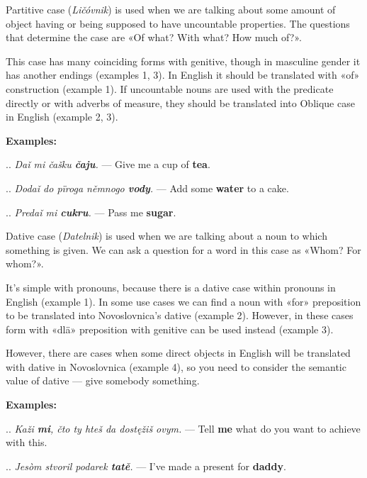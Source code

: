 Partitive case (\textit{Ličóvnik}) is used when we are talking about some amount of object having or being supposed to have uncountable properties. The questions that determine the case are «Of what? With what? How much of?».

This case has many coinciding forms with genitive, though in masculine gender it has another endings (examples 1, 3). In English it should be translated with «of» construction (example 1). If uncountable nouns are used with the predicate directly or with adverbs of measure, they should be translated into Oblique case in English (example 2, 3).

\textbf{Examples:}

.. \textit{Daǐ mi čašku \textbf{čaju}.} — Give me a cup of \textbf{tea}.

.. \textit{Dodaǐ do pïroga němnogo \textbf{vody}.} — Add some \textbf{water} to a cake.

.. \textit{Predaǐ mi \textbf{cukru}.} — Pass me \textbf{sugar}.

Dative case (\textit{Datelnik}) is used when we are talking about a noun to which something is given. We can ask a question for a word in this case as «Whom? For whom?».

It's simple with pronouns, because there is a dative case within pronouns in English (example 1). In some use cases we can find a noun with «for» preposition to be translated into Novoslovnica's dative (example 2). However, in these cases form with «dlä» preposition with genitive can be used instead (example 3).

However, there are cases when some direct objects in English will be translated with dative in Novoslovnica (example 4), so you need to consider the semantic value of dative — give somebody something.

\textbf{Examples:}

.. \textit{Kaži \textbf{mi}, čto ty hteš da dostęžiš ovym.} — Tell \textbf{me} what do you want to achieve with this.

.. \textit{Jesòm stvoril podarek \textbf{tatě}.} — I've made a present for \textbf{daddy}.

